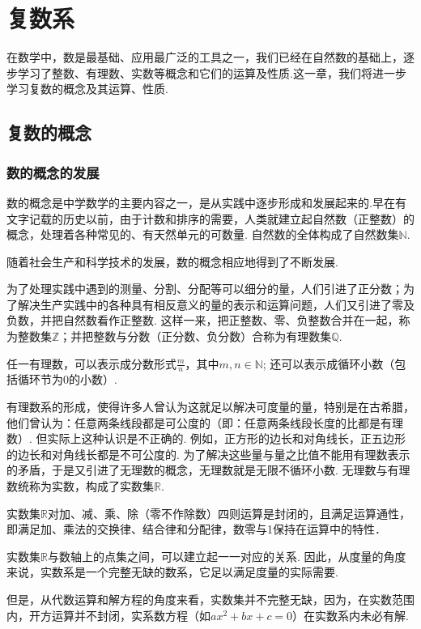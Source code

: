 \chapter{复数系}

在数学中，数是最基础、应用最广泛的工具之一，我们已经在自然数的基础上，逐步学习了整数、有理数、实数等概念和它们的运算及性质.这一章，我们将进一步学习复数的概念及其运算、性质.

\section{复数的概念}
\subsection{数的概念的发展}

数的概念是中学数学的主要内容之一，是从实践中逐步形成和发展起来的.早在有文字记载的历史以前，由于计数和排序的需要，人类就建立起自然数（正整数）的概念，处理着各种常见的、有天然单元的可数量. 自然数的全体构成了自然数集$\mathbb{N}$.

随着社会生产和科学技术的发展，数的概念相应地得到了不断发展.

为了处理实践中遇到的测量、分割、分配等可以细分的量，人们引进了正分数；为了解决生产实践中的各种具有相反意义的量的表示和运算问题，人们又引进了零及负数，并把自然数看作正整数. 这样一来，把正整数、零、负整数合并在一起，称为整数集$\mathbb{Z}$；并把整数与分数（正分数、负分数）合称为有理数集$\mathbb{Q}$.

任一有理数，可以表示成分数形式$\frac{m}{n}$，其中$m,n\in\mathbb{N}$; 还可以表示成循环小数（包括循环节为0的小数）.

有理数系的形成，使得许多人曾认为这就足以解决可度量的量，特别是在古希腊，他们曾认为：任意两条线段都是可公度的（即：任意两条线段长度的比都是有理数）. 但实际上这种认识是不正确的. 例如，正方形的边长和对角线长，正五边形的边长和对角线长都是不可公度的. 为了解决这些量与量之比值不能用有理数表示的矛盾，于是又引进了无理数的概念，无理数就是无限不循环小数. 无理数与有理数统称为实数，构成了实数集$\mathbb{R}$.

实数集$\mathbb{R}$对加、减、乘、除（零不作除数）四则运算是封闭的，且满足运算通性，即满足加、乘法的交换律、结合律和分配律，数零与1保持在运算中的特性．

实数集$\mathbb{R}$与数轴上的点集之间，可以建立起一一对应的关系. 因此，从度量的角度来说，实数系是一个完整无缺的数系，它足以满足度量的实际需要.

但是，从代数运算和解方程的角度来看，实数集并不完整无缺，因为，在实数范围内，开方运算并不封闭，实系数方程（如$ax^2+bx+c=0$）在实数系内未必有解.

